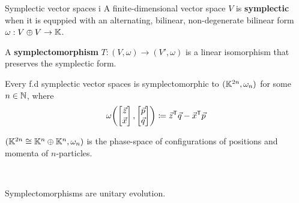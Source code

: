 \documentclass{beamer}
\begin{document}
\begin{frame}{Symplectic vector spaces i}
%
A finite-dimensional vector space \(V\) is \textbf{symplectic} when it is equppied with an alternating, bilinear, non-degenerate bilinear form \(\omega:V\oplus V\to \mathbb{K}\).

A \textbf{symplectomorphism} \(T:(V, \omega)\to (V', \omega)\) is a linear isomorphism that preserves the symplectic form.


\begin{theorem}
Every f.d symplectic vector spaces is symplectomorphic to  \((\mathbb{K}^{2n}, \omega_n)\)  for some \(n\in\mathbb{N}\), where \[\omega\! \left(\begin{bmatrix} \vec z\\ \vec x \end{bmatrix},\begin{bmatrix} \vec p\\ \vec q \end{bmatrix}\right)\coloneqq {\vec z}^{\mathsf{T}} {\vec q}-{\vec x}^{\mathsf{T}} {\vec p}\]
\end{theorem}

 \((\mathbb{K}^{2n}\cong \mathbb{K}^n \oplus \mathbb{K}^n, \omega_n)\) is the phase-space of configurations of positions and momenta of \(n\)-particles.

\

Symplectomorphisms are unitary evolution.
\end{frame}
\end{document}
